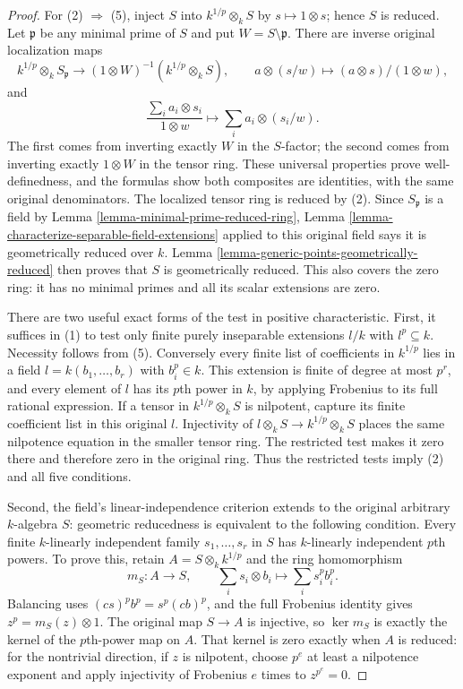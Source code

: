 \begin{proof}
For (2) $\Rightarrow$ (5), inject $S$ into
$k^{1/p}\otimes_k S$ by $s\mapsto1\otimes s$;
hence $S$ is reduced. Let $\mathfrak p$ be any
minimal prime of $S$ and put $W=S\setminus\mathfrak p$.
There are inverse original localization maps
$$
k^{1/p}\otimes_k S_{\mathfrak p}
\longrightarrow (1\otimes W)^{-1}(k^{1/p}\otimes_k S),
\qquad a\otimes(s/w)\longmapsto (a\otimes s)/(1\otimes w),
$$
and
$$
\frac{\sum_i a_i\otimes s_i}{1\otimes w}
\longmapsto\sum_i a_i\otimes(s_i/w).
$$
The first comes from inverting exactly $W$ in
the $S$-factor; the second comes from inverting
exactly $1\otimes W$ in the tensor ring. These
universal properties prove well-definedness,
and the formulas show both composites are
identities, with the same original denominators.
The localized tensor ring is reduced by (2).
Since $S_{\mathfrak p}$ is a field by Lemma
\ref{lemma-minimal-prime-reduced-ring}, Lemma
\ref{lemma-characterize-separable-field-extensions}
applied to this original field says it is
geometrically reduced over $k$. Lemma
\ref{lemma-generic-points-geometrically-reduced}
then proves that $S$ is geometrically reduced.
This also covers the zero ring: it has no
minimal primes and all its scalar extensions
are zero.

There are two useful exact forms of the test in
positive characteristic. First, it suffices in
(1) to test only finite purely inseparable
extensions $l/k$ with $l^p\subseteq k$.
Necessity follows from (5). Conversely every
finite list of coefficients in $k^{1/p}$ lies
in a field $l=k(b_1,\ldots,b_r)$ with $b_i^p\in k$.
This extension is finite of degree at most $p^r$,
and every element of $l$ has its $p$th power in
$k$, by applying Frobenius to its full rational
expression. If a tensor in $k^{1/p}\otimes_k S$
is nilpotent, capture its finite coefficient
list in this original $l$. Injectivity of
$l\otimes_k S\to k^{1/p}\otimes_k S$ places the
same nilpotence equation in the smaller tensor
ring. The restricted test makes it zero there
and therefore zero in the original ring.
Thus the restricted tests imply (2) and all
five conditions.

Second, the field's linear-independence criterion
extends to the original arbitrary $k$-algebra $S$:
geometric reducedness is equivalent to the
following condition. Every finite $k$-linearly
independent family $s_1,\ldots,s_r$ in $S$ has
$k$-linearly independent $p$th powers. To prove
this, retain $A=S\otimes_k k^{1/p}$ and the ring
homomorphism
$$
m_S:A\longrightarrow S,\qquad
\sum_i s_i\otimes b_i\longmapsto\sum_i s_i^p b_i^p.
$$
Balancing uses $(cs)^p b^p=s^p(cb)^p$, and the
full Frobenius identity gives
$z^p=m_S(z)\otimes1$. The original map
$S\to A$ is injective, so $\ker m_S$ is exactly
the kernel of the $p$th-power map on $A$.
That kernel is zero exactly when $A$ is reduced:
for the nontrivial direction, if $z$ is nilpotent,
choose $p^e$ at least a nilpotence exponent and
apply injectivity of Frobenius $e$ times to
$z^{p^e}=0$.


\end{proof}

